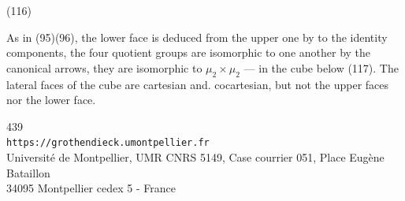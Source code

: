 
\noindent (116)

As in (95)(96), the lower face is deduced from the upper one by
 to the identity components, the four quotient groups are
isomorphic to one another by the canonical arrows, they are isomorphic to
$\mu_2\times\mu_2$ ---  in the cube 
below (117). The lateral faces of the cube are cartesian and.
cocartesian, but not the upper faces nor the lower face.


\begin{center}
{\small
439\\
\texttt{https://grothendieck.umontpellier.fr}\\
Université de Montpellier, UMR CNRS 5149, Case courrier 051, Place Eugène Bataillon\\
34095 Montpellier cedex 5 - France
}
\end{center}

